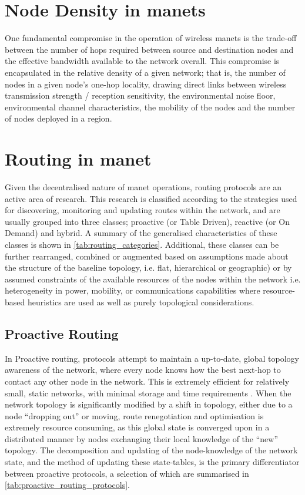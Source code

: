 \section{Node Density in \glspl{manet}}

One fundamental compromise in the operation of wireless \glspl{manet} is the trade-off between the number of hops required between source and destination nodes and the effective bandwidth available to the network overall\cite{Royer2001}.
This compromise is encapsulated in the relative density of a given network; that is, the number of nodes in a given node's one-hop locality, drawing direct links between wireless transmission strength / reception sensitivity, the environmental noise floor, environmental channel characteristics, the mobility of the nodes and the number of nodes deployed in a region.


\section{Routing in \acrlong{manet}}

Given the decentralised nature of \gls{manet} operations, routing protocols are an active area of research. 
This research is classified according to the strategies used for discovering, monitoring and updating routes within the network, and are usually grouped into three classes; proactive (or Table Driven), reactive (or On Demand) and hybrid.
A summary of the generalised characteristics of these classes is shown in \autoref{tab:routing_categories}.
Additional, these classes can be further rearranged, combined or augmented based on assumptions made about the structure of the baseline topology, i.e. flat, hierarchical or geographic) or by assumed constraints of the available resources of the nodes within the network i.e. heterogeneity in power, mobility, or communications capabilities where resource-based heuristics are used as well as purely topological considerations\cite{Li2005}\cite{Gerla2002}.

\subsection{Proactive Routing}

In Proactive routing, protocols attempt to maintain a up-to-date, global topology awareness of the network, where every node knows how the best next-hop to contact any other node in the network.
This is extremely efficient for relatively small, static networks, with minimal storage and time requirements \cite{}.
When the network topology is significantly modified by a shift in topology, either due to a node ``dropping out'' or moving, route renegotiation and optimisation is extremely resource consuming, as this global state is converged upon in a distributed manner by nodes exchanging their local knowledge of the ``new'' topology.
The decomposition and updating of the node-knowledge of the network state, and the method of updating these state-tables, is the primary differentiator between proactive protocols, a selection of which are summarised in \autoref{tab:proactive_routing_protocols}.

